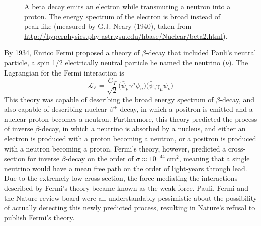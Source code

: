 \documentclass[/main.tex]{subfiles}
\begin{document}
\begin{figure}[t]
  \centering
  \caption[Beta decay and energy spectrum]{\label{fig:beta}
    A beta decay emits an electron while transmuting a neutron into a proton. The energy spectrum of the electron is broad instead of peak-like (measured by G.J. Neary (1940), taken from \url{http://hyperphysics.phy-astr.gsu.edu/hbase/Nuclear/beta2.html}).
  }
\end{figure}
By 1934, Enrico Fermi proposed a theory of $\beta$-decay that included Pauli's neutral particle, a spin 1/2 electrically neutral particle he named the neutrino ($\nu$)\cite{Fermi1934}.
The Lagrangian for the Fermi interaction is
\begin{equation}
  \mathcal{L}_F=\frac{G_F}{\sqrt{2}}\big(\bar \psi_p \gamma^\mu \psi_n\big)\big(\bar \psi_e \gamma_\mu \psi_\nu\big)
\end{equation}
This theory was capable of describing the broad energy spectrum of $\beta$-decay, and also capable of describing nuclear $\beta^+$-decay, in which a positron is emitted and a nuclear proton becomes a neutron.
Furthermore, this theory predicted the process of inverse $\beta$-decay, in which a neutrino is absorbed by a nucleus, and either an electron is produced with a proton becoming a neutron, or a positron is produced with a neutron becoming a proton.
Fermi's theory, however, predicted a cross-section for inverse $\beta$-decay on the order of $\sigma\approx10^{-44}~\mathrm{cm}^2$, meaning that a single neutrino would have a mean free path on the order of light-years through lead.
Due to the extremely low cross-section, the force mediating the interactions described by Fermi's theory became known as the weak force.
Pauli, Fermi and the Nature review board were all understandably pessimistic about the possibility of actually detecting this newly predicted process, resulting in Nature's refusal to publish Fermi's theory\cite{Pais1988}.
\end{document}
